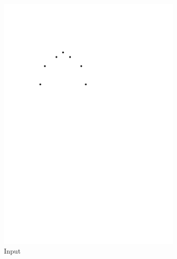 \documentclass[11pt]{article}
\begin{document}
\begin{figure}[hbtp]
\centering
\begin{subfigure}{.33\linewidth}
  \centering
  \includegraphics[width=0.9\linewidth]{multiplecurves/algo_step0_dots.pdf}
  \caption{Input}
\end{subfigure}%
\begin{subfigure}{.33\linewidth}
  \centering

\end{subfigure}
\end{figure}
\end{document}
